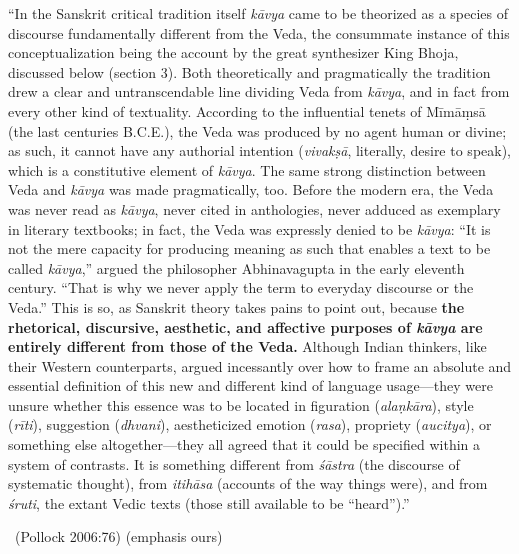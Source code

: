 \begin{myquote}
“In the Sanskrit critical tradition itself \textit{kāvya} came to be theorized as a species of discourse fundamentally different from the Veda, the consummate instance of this conceptualization being the account by the great synthesizer King Bhoja, discussed below (section 3). Both theoretically and pragmatically the tradition drew a clear and untranscendable line dividing Veda from \textit{kāvya}, and in fact from every other kind of textuality. According to the influential tenets of Mīmāṃsā (the last centuries B.C.E.), the Veda was produced by no agent human or divine; as such, it cannot have any authorial intention (\textit{vivakṣā}, literally, desire to speak), which is a constitutive element of \textit{kāvya}. The same strong distinction between Veda and \textit{kāvya} was made pragmatically, too. Before the modern era, the Veda was never read as \textit{kāvya}, never cited in anthologies, never adduced as exemplary in literary textbooks; in fact, the Veda was expressly denied to be \textit{kāvya}: “It is not the mere capacity for producing meaning as such that enables a text to be called \textit{kāvya},” argued the philosopher Abhinavagupta in the early eleventh century. “That is why we never apply the term to everyday discourse or the Veda.” This is so, as Sanskrit theory takes pains to point out, because \textbf{the rhetorical, discursive, aesthetic, and affective purposes of \textit{kāvya} are entirely different from those of the Veda.} Although Indian thinkers, like their Western counterparts, argued incessantly over how to frame an absolute and essential definition of this new and different kind of language usage—they were unsure whether this essence was to be located in figuration (\textit{alaṇkāra}), style (\textit{rīti}), suggestion (\textit{dhvani}), aestheticized emotion (\textit{rasa}), propriety (\textit{aucitya}), or something else altogether—they all agreed that it could be specified within a system of contrasts. It is something different from \textit{śāstra} (the discourse of systematic thought), from \textit{itihāsa} (accounts of the way things were), and from \textit{śruti}, the extant Vedic texts (those still available to be “heard”).” 

~\hfill (Pollock 2006:76) (emphasis ours)
\end{myquote}

